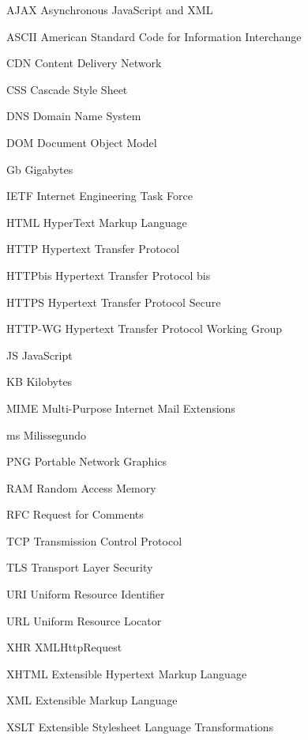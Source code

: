 %
%

\begin{siglas}
	\item[AJAX] Asynchronous JavaScript and XML
	\item[ASCII] American Standard Code for Information Interchange
	\item[CDN] Content Delivery Network
	\item[CSS] Cascade Style Sheet
	\item[DNS] Domain Name System
	\item[DOM] Document Object Model
	\item[Gb] Gigabytes
	\item[IETF] Internet Engineering Task Force
    \item[HTML] HyperText Markup Language
    \item[HTTP] Hypertext Transfer Protocol
    \item[HTTPbis] Hypertext Transfer Protocol bis
	\item[HTTPS] Hypertext Transfer Protocol Secure
    \item[HTTP-WG] Hypertext Transfer Protocol Working Group
    \item[JS] JavaScript
    \item[KB] Kilobytes
    \item[MIME] Multi-Purpose Internet Mail Extensions
    \item[ms] Milissegundo
    \item[PNG] Portable Network Graphics
    \item[RAM] Random Access Memory
    \item[RFC] Request for Comments
    \item[TCP] Transmission Control Protocol
    \item[TLS] Transport Layer Security
    \item[URI] Uniform Resource Identifier
    \item[URL] Uniform Resource Locator
    \item[XHR] XMLHttpRequest
    \item[XHTML] Extensible Hypertext Markup Language
    \item[XML] Extensible Markup Language
    \item[XSLT] Extensible Stylesheet Language Transformations
\end{siglas}
